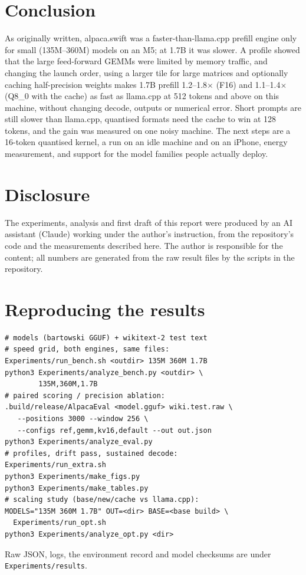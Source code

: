 \documentclass[10pt,twocolumn]{article}
\begin{document}
\section{Conclusion}
As originally written, alpaca.swift was a faster-than-llama.cpp prefill engine only for small (135M--360M) models on an M5; at 1.7B it was slower. A profile showed that the large feed-forward GEMMs were limited by memory traffic, and changing the launch order, using a larger tile for large matrices and optionally caching half-precision weights makes 1.7B prefill 1.2--1.8$\times$ (F16) and 1.1--1.4$\times$ (Q8\_0 with the cache) as fast as llama.cpp at 512 tokens and above on this machine, without changing decode, outputs or numerical error. Short prompts are still slower than llama.cpp, quantised formats need the cache to win at 128 tokens, and the gain was measured on one noisy machine. The next steps are a 16-token quantised kernel, a run on an idle machine and on an iPhone, energy measurement, and support for the model families people actually deploy.

\section*{Disclosure}
The experiments, analysis and first draft of this report were produced by an AI assistant (Claude) working under the author's instruction, from the repository's code and the measurements described here. The author is responsible for the content; all numbers are generated from the raw result files by the scripts in the repository.

\appendix
\section{Reproducing the results}
\label{app:repro}
\begin{small}
\begin{verbatim}
# models (bartowski GGUF) + wikitext-2 test text
# speed grid, both engines, same files:
Experiments/run_bench.sh <outdir> 135M 360M 1.7B
python3 Experiments/analyze_bench.py <outdir> \
        135M,360M,1.7B
# paired scoring / precision ablation:
.build/release/AlpacaEval <model.gguf> wiki.test.raw \
   --positions 3000 --window 256 \
   --configs ref,gemm,kv16,default --out out.json
python3 Experiments/analyze_eval.py
# profiles, drift pass, sustained decode:
Experiments/run_extra.sh
python3 Experiments/make_figs.py
python3 Experiments/make_tables.py
# scaling study (base/new/cache vs llama.cpp):
MODELS="135M 360M 1.7B" OUT=<dir> BASE=<base build> \
  Experiments/run_opt.sh
python3 Experiments/analyze_opt.py <dir>
\end{verbatim}
\end{small}
Raw JSON, logs, the environment record and model checksums are under \texttt{Experiments/results}.
\end{document}
